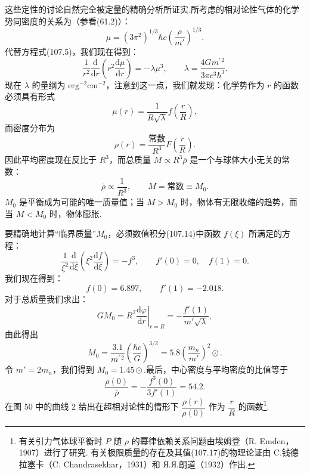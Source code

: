 这些定性的讨论自然完全被定量的精确分析所证实.所考虑的相对论性气体的化学势同密度的关系为（参看(61.2)）：
\begin{equation}
  \mu=(3\pi^2)^{1/3}\hbar c\left(\frac{\rho}{m'}\right)^{1/3}.
\end{equation}
代替方程式(107.5)，我们现在得到：
\begin{equation}
  \frac{1}{r^2}\frac{\mathrm{d}}{\mathrm{d}r}
  \left(r^2\frac{\mathrm{d}\mu}{\mathrm{d}r}\right)=-\lambda\mu^3,
  \qquad\lambda=\frac{4Gm^{\prime\,2}}{3\pi c^3\hbar^3}.
\end{equation}
现在 $\lambda$ 的量纲为 $\mathrm{erg^{-2}cm^{-2}}$，注意到这一点，我们就发现：化学势作为 $r$ 的函数必须具有形式
\begin{equation}
  \mu(r)=\frac{1}{R\sqrt{\lambda}}f\left(\frac rR\right),
\end{equation}
而密度分布为
\begin{equation*}
  \rho(r)=\frac{\text{常数}}{R^3}F\left(\frac rR\right).
\end{equation*}
因此平均密度现在反比于 $R^3$，而总质量 $M\propto R^3\bar{\rho}$ 是一个与球体大小无关的常数：
\begin{equation}
  \bar{\rho}\propto\frac{1}{R^3},\qquad
  M=\text{常数}\equiv M_0.
\end{equation}
$M_0$ 是平衡成为可能的唯一质量值；当 $M>M_0$ 时，物体有无限收缩的趋势，而当 $M<M_0$ 时，物体膨胀.

要精确地计算“临界质量”$M_0$，必须数值积分(107.14)中函数 $f(\xi)$ 所满足的方程：
\begin{equation}
  \frac{1}{\xi^2}\frac{\mathrm{d}}{\mathrm{d}\xi}
  \left(\xi^2\frac{\mathrm{d}f}{\mathrm{d}\xi}\right)=-f^3,\qquad
  f'(0)=0,\quad f(1)=0.
\end{equation}
我们现在得到：
\begin{equation*}
  f(0)=6.897,\qquad f'(1)=-2.018.
\end{equation*}
对于总质量我们求出：
\begin{equation*}
  GM_0=\left.R^2\frac{\mathrm{d}\varphi}{\mathrm{d}r}\right|_{r=R}
  =-\frac{f'(1)}{m'\sqrt{\lambda}},
\end{equation*}
由此得出
\begin{equation}
  M_0=\frac{3.1}{m^{\prime\,2}}\left(\frac{\hbar c}{G}\right)^{3/2}
  =5.8\left(\frac{m_n}{m'}\right)^2\odot.
\end{equation}
令 $m'=2m_n$，我们得到 $M_0=1.45\odot$.最后，中心密度与平均密度的比值等于
\begin{equation*}
  \frac{\rho(0)}{\bar{\rho}}=-\frac{f^3(0)}{3f'(1)}=54.2.
\end{equation*}
在图 50 中的曲线 2 给出在超相对论性的情形下 $\dfrac{\rho(r)}{\rho(0)}$ 作为 $\dfrac rR$ 的函数\footnote{有关引力气体球平衡时 $P$ 随 $\rho$ 的幂律依赖关系问题由埃姆登（R. Emden，1907）进行了研究. 有关极限质量的存在及其值(107.17)的物理论证由 C.钱德拉塞卡（C. Chandrasekhar，1931）和 Я.Я.朗道（1932）作出.}.

